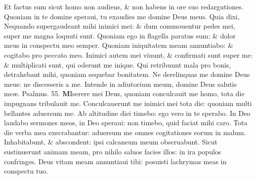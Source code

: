 \documentclass[a5paper,10pt]{book}
\def\ae{æ}
\begin{document}
\begin{multicols*}{2}
\newline \color{red} E\color{black}t factus sum sicut homo non audiens, \& non habens in ore suo redargutiones.
\newline \color{red} Q\color{black}uoniam in te domine speraui, tu exaudies me domine Deus meus.
\newline \color{red} Q\color{black}uia dixi, Nequando supergaudeant mihi inimici mei: \& dum commouentur pedes mei, super me magna loquuti sunt.
\newline \color{red} Q\color{black}uoniam ego in flagella paratus sum: \& dolor meus in conspectu meo semper.
\newline \color{red} Q\color{black}uoniam iniquitatem meam annuntiabo: \& cogitabo pro peccato meo.
\newline \color{red} I\color{black}nimici autem mei viuunt, \& confirmati sunt super me: \& multiplicati sunt, qui oderunt me inique.
\newline \color{red} Q\color{black}ui retribuunt mala pro bonis, detrahebant mihi, quoniam sequebar bonitatem.
\newline \color{red} N\color{black}e derelinquas me domine Deus meus: ne discesseris a me.
\newline \color{red} I\color{black}ntende in adiutorium meum, domine Deus salutis me\ae . \quad \color{red} Psalmus. \hypertarget{ps55}{55.} \color{black}
\vspace{-.5em}
\lettrine[lines=2]{\bfseries \color{red} M}{}Iserere mei Deus, quoniam conculcauit me homo, tota die impugnans tribulauit me.
\newline \color{red} C\color{black}onculcauerunt me inimici mei tota die: quoniam multi bellantes aduersum me.
\newline \color{red} A\color{black}b altitudine diei timebo: ego vero in te sperabo.
\newline \color{red} I\color{black}n Deo laudabo sermones meos, in Deo speraui: non timebo, quid faciat mihi caro.
\newline \color{red} T\color{black}ota die verba mea execrabantur: aduersum me omnes cogitationes eorum in malum.
\newline \color{red} I\color{black}nhabitabunt, \& abscondent: ipsi calcaneum meum obseruabunt.
\newline \color{red} S\color{black}icut sustinuerunt animam meam, pro nihilo saluos facies illos: in ira populos confringes.
\newline \color{red} D\color{black}eus vitam meam annuntiaui tibi: posuisti lachrymas meas in conspectu tuo.

\end{multicols*}
\end{document}
